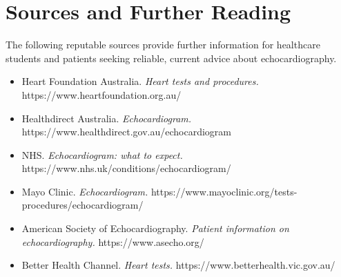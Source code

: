 \section*{Sources and Further Reading}
The following reputable sources provide further information for healthcare students and patients seeking reliable, current advice about echocardiography.
\begin{itemize}
    \item Heart Foundation Australia. \textit{Heart tests and procedures.} https://www.heartfoundation.org.au/
    \item Healthdirect Australia. \textit{Echocardiogram.} https://www.healthdirect.gov.au/echocardiogram
    \item NHS. \textit{Echocardiogram: what to expect.} https://www.nhs.uk/conditions/echocardiogram/
    \item Mayo Clinic. \textit{Echocardiogram.} https://www.mayoclinic.org/tests-procedures/echocardiogram/
    \item American Society of Echocardiography. \textit{Patient information on echocardiography.} https://www.asecho.org/
    \item Better Health Channel. \textit{Heart tests.} https://www.betterhealth.vic.gov.au/
\end{itemize}
